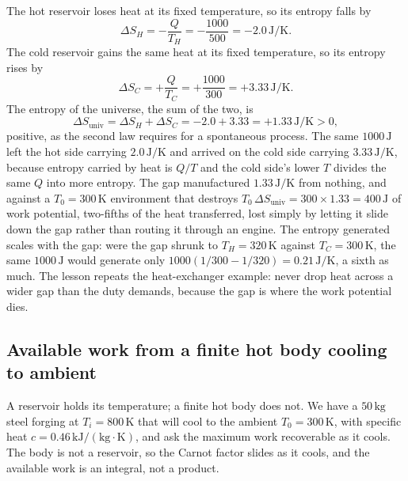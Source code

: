 The hot reservoir loses heat at its fixed temperature, so its entropy
falls by
\[
\Delta S_H = -\frac{Q}{T_H} = -\frac{1000}{500} = -2.0\,\si{\joule\per\kelvin}.
\]
The cold reservoir gains the same heat at its fixed temperature, so its
entropy rises by
\[
\Delta S_C = +\frac{Q}{T_C} = +\frac{1000}{300} = +3.33\,\si{\joule\per\kelvin}.
\]
The entropy of the universe, the sum of the two, is
\[
\Delta S_{\text{univ}} = \Delta S_H + \Delta S_C
= -2.0 + 3.33 = +1.33\,\si{\joule\per\kelvin} > 0,
\]
positive, as the second law requires for a spontaneous process. The same
$1000\,\text{J}$ left the hot side carrying $2.0\,\si{\joule\per\kelvin}$
and arrived on the cold side carrying $3.33\,\si{\joule\per\kelvin}$,
because entropy carried by heat is $Q/T$ and the cold side's lower $T$
divides the same $Q$ into more entropy. The gap manufactured
$1.33\,\si{\joule\per\kelvin}$ from nothing, and against a $T_0 =
300\,\si{\kelvin}$ environment that destroys $T_0\,\Delta S_{\text{univ}}
= 300 \times 1.33 = 400\,\text{J}$ of work potential, two-fifths of the
heat transferred, lost simply by letting it slide down the gap rather than
routing it through an engine. The entropy generated scales with the gap:
were the gap shrunk to $T_H = 320\,\si{\kelvin}$ against $T_C =
300\,\si{\kelvin}$, the same $1000\,\text{J}$ would generate only
$1000(1/300 - 1/320) = 0.21\,\si{\joule\per\kelvin}$, a sixth as much. The
lesson repeats the heat-exchanger example: never drop heat across a wider
gap than the duty demands, because the gap is where the work potential
dies.

\subsection{Available work from a finite hot body cooling to ambient}

A reservoir holds its temperature; a finite hot body does not. We have a
$50\,\text{kg}$ steel forging at $T_i = 800\,\si{\kelvin}$ that will cool
to the ambient $T_0 = 300\,\si{\kelvin}$, with specific heat $c =
0.46\,\text{kJ}/(\text{kg}\cdot\si{\kelvin})$, and ask the maximum work
recoverable as it cools. The body is not a reservoir, so the Carnot factor
slides as it cools, and the available work is an integral, not a product.

